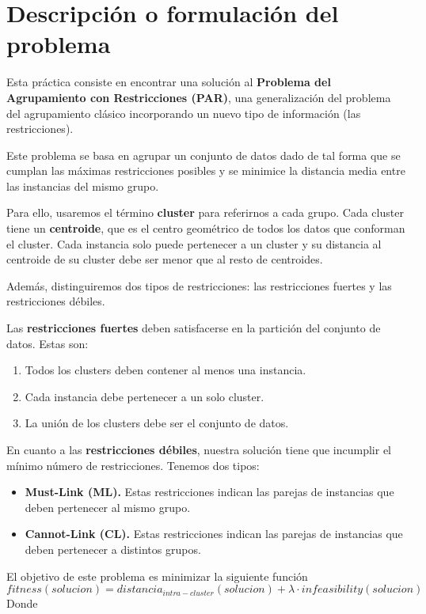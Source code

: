 \section{Descripción o formulación del problema}
	Esta práctica consiste en encontrar una solución al \textbf{Problema del Agrupamiento con Restricciones (PAR)},
	una generalización del problema del agrupamiento clásico incorporando un nuevo tipo de información (las restricciones).

	Este problema se basa en agrupar un conjunto de datos dado de tal forma que se cumplan las máximas restricciones posibles y
	se minimice la distancia media entre las instancias del mismo grupo.

	Para ello, usaremos el término \textbf{cluster} para referirnos a cada grupo. Cada cluster tiene un
	\textbf{centroide}, que es el centro geométrico de todos los datos que conforman el cluster. Cada instancia
	solo puede pertenecer a un cluster y su distancia al centroide de su cluster debe ser menor que al resto de centroides.

	Además, distinguiremos dos tipos de restricciones: las restricciones fuertes y las restricciones débiles.

	Las \textbf{restricciones fuertes} deben satisfacerse en la partición del conjunto de datos. Estas son:

	\begin{enumerate}
		\item Todos los clusters deben contener al menos una instancia.
		\item Cada instancia debe pertenecer a un solo cluster.
		\item La unión de los clusters debe ser el conjunto de datos.
	\end{enumerate}

	En cuanto a las \textbf{restricciones débiles}, nuestra solución tiene que incumplir el mínimo número de restricciones. Tenemos dos tipos:

	\begin{itemize}
		\item \textbf{Must-Link (ML).} Estas restricciones indican las parejas de instancias que deben pertenecer al mismo grupo.
		\item \textbf{Cannot-Link (CL).} Estas restricciones indican las parejas de instancias que deben pertenecer a distintos grupos.
	\end{itemize}

	El objetivo de este problema es minimizar la siguiente función
	$$fitness (solucion) = distancia_{intra-cluster} (solucion) + \lambda \cdot infeasibility (solucion)$$
	Donde


